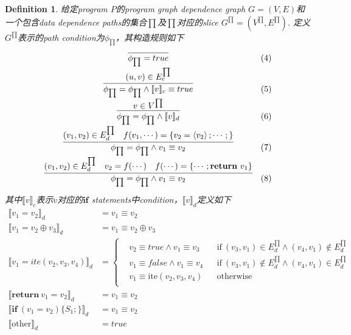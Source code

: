 \documentclass{article}
\newtheorem{definition}[theorem]{Definition}
\newcommand{\abracket}[1]{\ensuremath{\left< #1 \right>}}
\begin{document}
\begin{definition}
\rm 给定program $P$的program graph dependence graph $G=(V,E)$和一个包含data dependence paths的集合$\prod$及$\prod$对应的slice $G^{\prod} = (V^{\prod},E^{\prod})$. 定义$G^{\prod}$表示的path condition为$\phi_{\prod}$，其构造规则如下
$$
\begin{array}{cl}
\infer{\phi_{\prod}=true}{&&&&} & (4)\\[0.5em]
\infer{\phi_{\prod}=\phi_{\prod}\wedge \llbracket v \rrbracket_c \equiv true}{(u,v) \in E_c^{\prod}} & (5) \\[0.5em] 
\infer{\phi_{\prod}=\phi_{\prod}\wedge \llbracket v \rrbracket_d}{v \in V^{\prod}} & (6) \\[0.5em]
\infer{\phi_{\prod}=\phi_{\prod}\wedge v_1 \equiv v_2}{(v_1,v_2) \in E_d^{\prod} & f(v_1,\cdots) = \{v_2 = \abracket{v_2}; \cdots;\}} & (7) \\[0.5em]
\infer{\phi_{\prod}=\phi_{\prod}\wedge v_1 \equiv v_2}{(v_1,v_2) \in E_d^{\prod} & v_2 = f(\cdots) & f(\cdots) = \{\cdots;\textbf{return}~v_1\}}  & (8) \\[0.5em]
\end{array}
$$
其中$\llbracket v \rrbracket_c$表示$v$对应的$\textbf{if}$ statements中condition，$\llbracket v \rrbracket_d$定义如下
$$
\begin{array}{rl}
\llbracket v_1 = v_2 \rrbracket_d &= v_1 \equiv v_2 \\
\llbracket v_1 = v_2 \oplus v_3 \rrbracket_d &= v_1 \equiv v_2 \oplus v_3\\
\llbracket v_1 = ite(v_2,v_3,v_4) \rrbracket_d & = \left\{\begin{aligned}
&v_2 \equiv true \wedge v_1 \equiv v_3 && \text{if}~(v_3,v_1) \in E_d^{\prod} \wedge (v_4,v_1) \notin E_d^{\prod} \\
&v_1 \equiv false \wedge v_1 \equiv v_4 && \text{if}~(v_3,v_1) \notin E_d^{\prod} \wedge (v_4,v_1) \in E_d^{\prod} \\
&v_1 \equiv \text{ite}(v_2,v_3,v_4) && \text{otherwise} \\
\end{aligned}\right. \\
\llbracket \textbf{return}~v_1 = v_2 \rrbracket_d &= v_1 \equiv v_2 \\
\llbracket \textbf{if}~(v_1 = v_2)\{S_1;\} \rrbracket_d &= v_1 \equiv v_2 \\
\llbracket \text{other} \rrbracket_d &= true
\end{array}
$$
\end{definition}
\end{document}
